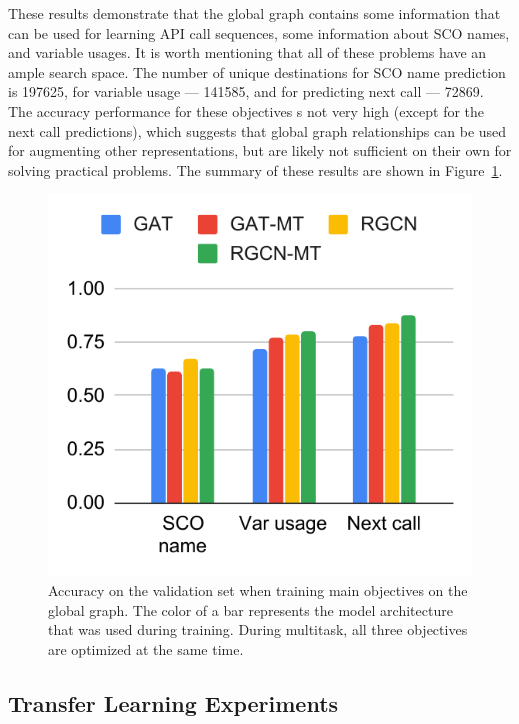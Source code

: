 \documentclass[a4paper,twoside]{article}
\begin{document}
These results demonstrate that the global graph contains some information that can be used for learning API call sequences, some information about SCO names, and variable usages. It is worth mentioning that all of these problems have an ample search space. The number of unique destinations for SCO name prediction is 197625, for variable usage --- 141585, and for predicting next call --- 72869. The accuracy performance for these objectives s not very high (except for the next call predictions), which suggests that global graph relationships can be used for augmenting other representations, but are likely not sufficient on their own for solving practical problems. The summary of these results are shown in Figure~\ref{fig:main_obj}.

\begin{figure}[]
    \centering
    \includegraphics[width=\columnwidth]{main_objective.pdf}
    \caption{Accuracy on the validation set when training main objectives on the global graph. The color of a bar represents the model architecture that was used during training. During multitask, all three objectives are optimized at the same time.}\label{fig:main_obj}
\end{figure}

\subsection{Transfer Learning Experiments}
\end{document}
